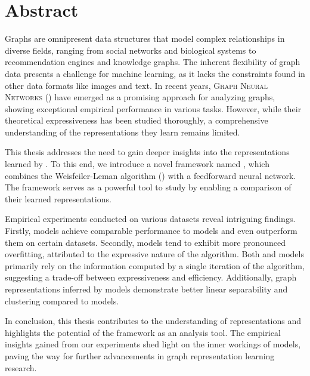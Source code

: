\chapter*{Abstract}

Graphs are omnipresent data structures that model complex relationships in diverse fields, ranging from social networks and biological systems to recommendation engines and knowledge graphs. The inherent flexibility of graph data presents a challenge for machine learning, as it lacks the constraints found in other data formats like images and text. In recent years, \textsc{Graph Neural Networks} (\gnns) have emerged as a promising approach for analyzing graphs, showing exceptional empirical performance in various tasks. However, while their theoretical expressiveness has been studied thoroughly, a comprehensive understanding of the representations they learn remains limited.

This thesis addresses the need to gain deeper insights into the representations learned by \gnns. To this end, we introduce a novel framework named \wlnn, which combines the Weisfeiler-Leman algorithm (\wl) with a feedforward neural network. The \wlnn framework serves as a powerful tool to study \gnns by enabling a comparison of their learned representations.

Empirical experiments conducted on various datasets reveal intriguing findings. Firstly, \wlnn models achieve comparable performance to \gnn models and even outperform them on certain datasets. Secondly, \wlnn models tend to exhibit more pronounced overfitting, attributed to the expressive nature of the \wl algorithm. Both \wlnn and \gnn models primarily rely on the information computed by a single iteration of the \wl algorithm, suggesting a trade-off between expressiveness and efficiency. Additionally, graph representations inferred by \gnn models demonstrate better linear separability and clustering compared to \wlnn models.

In conclusion, this thesis contributes to the understanding of \gnn representations and highlights the potential of the \wlnn framework as an analysis tool. The empirical insights gained from our experiments shed light on the inner workings of \gnn models, paving the way for further advancements in graph representation learning research.